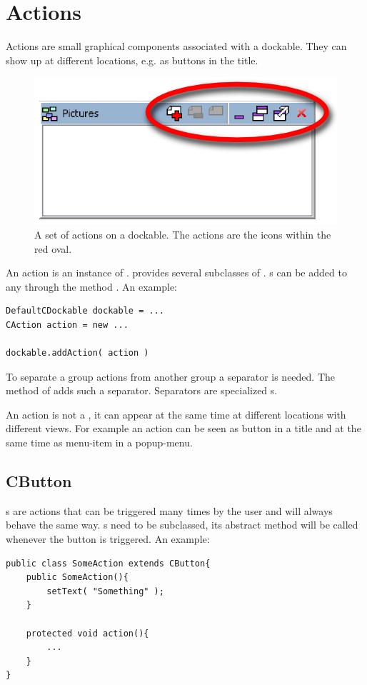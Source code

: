 \section{Actions} \label{sec:action}
Actions are small graphical components associated with a dockable. They can show up at different locations, e.g. as buttons in the title.
\begin{figure}[ht]
\centering
\includegraphics[scale=0.75]{actions/actions}
\caption{A set of actions on a dockable. The actions are the icons within the red oval.}
\label{fig:actions}
\end{figure}
An action is an instance of .  provides several subclasses of . s can be added to any  through the method . An example:
\begin{lstlisting}
DefaultCDockable dockable = ...
CAction action = new ...

dockable.addAction( action )
\end{lstlisting}

To separate a group actions from another group a separator is needed. The method  of  adds such a separator. Separators are specialized s.

An action is not a , it can appear at the same time at different locations with different views. For example an action can be seen as button in a title and at the same time as menu-item in a popup-menu.

\subsection{CButton}
s are actions that can be triggered many times by the user and will always behave the same way. s need to be subclassed, its abstract method  will be called whenever the button is triggered. An example:
\begin{lstlisting}
public class SomeAction extends CButton{
	public SomeAction(){
		setText( "Something" );
	}
	
	protected void action(){
		...
	}
}
\end{lstlisting}

